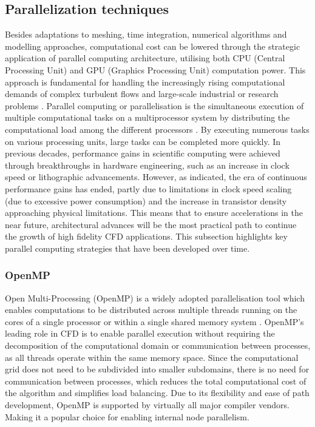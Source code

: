 \subsection{Parallelization techniques}
Besides adaptations to meshing, time integration, numerical algorithms and modelling approaches, computational cost can be lowered through the strategic application of parallel computing architecture, utilising both CPU (Central Processing Unit) and GPU (Graphics Processing Unit) computation power. This approach is fundamental for handling the increasingly rising computational demands of complex turbulent flows and large-scale industrial or research problems \cite{Driss2018}.
Parallel computing or parallelisation is the simultaneous execution of multiple computational tasks on a multiprocessor system by distributing the computational load among the different processors \cite{Afzal2017}. By executing numerous tasks on various processing units, large tasks can be completed more quickly. In previous decades, performance gains in scientific computing were achieved through breakthroughs in hardware engineering, such as an increase in clock speed or lithographic advancements. However, as \textcite{Shalf2020} indicated, the era of continuous performance gains has ended, partly due to limitations in clock speed scaling (due to excessive power consumption) and the increase in transistor density approaching physical limitations. This means that to ensure accelerations in the near future, architectural advances will be the most practical path to continue the growth of high fidelity CFD applications\cite{Shalf2020}. This subsection highlights key parallel computing strategies that have been developed over time. 


\subsubsection{OpenMP}
Open Multi-Processing (OpenMP) is a widely adopted parallelisation tool which enables computations to be distributed across multiple threads running on the cores of a single processor or within a single shared memory system \cite{Afzal2017}. OpenMP's leading role in CFD is to enable parallel execution without requiring the decomposition of the computational domain or communication between processes, as all threads operate within the same memory space. Since the computational grid does not need to be subdivided into smaller subdomains, there is no need for communication between processes, which reduces the total computational cost of the algorithm and simplifies load balancing\cite{Afzal2017}. Due to its flexibility and ease of path development, OpenMP is supported by virtually all major compiler vendors. Making it a popular choice for enabling internal node parallelism. 

